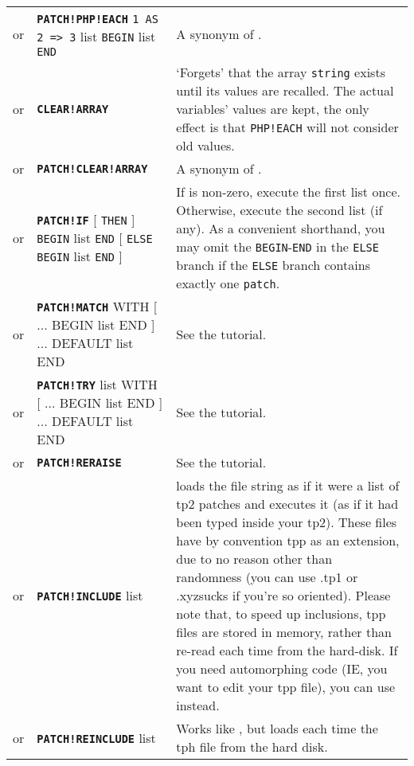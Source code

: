 \documentclass{article}
\def\ttref#1{\ahrefloc{#1}{\tt #1}}
\def\DEFINE#1{{\tt \bf #1}\label{#1}\index{#1}}
\def\t#1{{\tt #1}}
\def\Slist{{\color{red} list }}
\def\Ob{{\color{red} [ }}
\def\Oe{{\color{red} ] }}
\begin{document}
\begin{tabular}{cp{10in}|p{10in}}
or & \DEFINE{PATCH!PHP!EACH} \t{\ttref{String}1 AS \ttref{String}2 => \ttref{String}3} \Slist
                             \t{BEGIN} \ttref{patch} \Slist \t{END} &
    A synonym of \ttref{PHP!EACH}.
\\

or & \DEFINE{CLEAR!ARRAY} \ttref{String} &
    `Forgets' that the array \t{string} exists until its values are recalled.
    The actual variables' values are kept, the only effect is that \t{*PHP!EACH}
    will not consider old values.
\\

or & \DEFINE{PATCH!CLEAR!ARRAY} \ttref{String} &
    A synonym of \ttref{CLEAR!ARRAY}.
\\


or & \DEFINE{PATCH!IF} \ttref{value} \Ob \t{THEN} \Oe \t{BEGIN}
  \ttref{patch} \Slist \t{END} 
  \Ob \t{ELSE} \t{BEGIN} \ttref{patch} \Slist \t{END} \Oe 
  &
  If \ttref{value} is non-zero, execute the first \ttref{patch} \Slist 
  once. Otherwise, execute the second \ttref{patch} \Slist (if any). As a
  convenient shorthand, you may omit the \t{BEGIN}-\t{END} in the \t{ELSE}
  branch if the \t{ELSE} branch contains exactly one \t{patch}.  
  \\
  or & \DEFINE{PATCH!MATCH} \ttref{value} WITH \Ob \ttref{value} ...
    BEGIN \ttref{patch} \Slist END \Oe 
    ... DEFAULT \ttref{patch} \Slist END &
    See the \ttref{MATCH and TRY} tutorial.
  \\
  or & \DEFINE{PATCH!TRY} \ttref{patch} \Slist WITH \Ob \ttref{value} ...
    BEGIN \ttref{patch} \Slist END \Oe 
    ... DEFAULT \ttref{patch} \Slist END &
    See the \ttref{MATCH and TRY} tutorial.
  \\
  or & \DEFINE{PATCH!RERAISE} & See the \ttref{MATCH and TRY} tutorial.
  \\
or & \DEFINE{PATCH!INCLUDE} \t{\ttref{String}} \Slist &
    loads the file string as if it were a list of tp2 patches and executes it (as if
		it had been typed inside your tp2).
    These files have by convention tpp as an extension, due to no reason other than
    randomness (you can use .tp1 or .xyzsucks if you're so oriented).
		Please note that, to speed up inclusions, tpp files are stored in memory,
	  rather than re-read each time from the hard-disk. If you need automorphing code
		(IE, you want to edit your tpp file), you can use \ttref{PATCH!REINCLUDE} instead. \\
or & \DEFINE{PATCH!REINCLUDE} \t{\ttref{String}} \Slist &
    Works like \ttref{PATCH!INCLUDE}, but loads each time the tph file from the hard disk.

\end{tabular}
\end{document}
